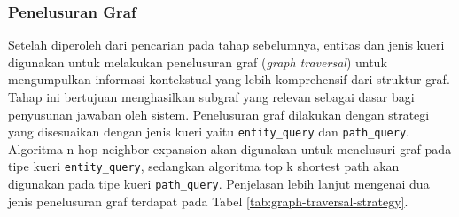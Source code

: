 \subsubsection{Penelusuran Graf}
Setelah diperoleh dari pencarian pada tahap sebelumnya, entitas dan jenis kueri digunakan untuk melakukan penelusuran graf (\textit{graph traversal}) untuk mengumpulkan informasi kontekstual yang lebih komprehensif dari struktur graf.
Tahap ini bertujuan menghasilkan subgraf yang relevan sebagai dasar bagi penyusunan jawaban oleh sistem.
Penelusuran graf dilakukan dengan strategi yang disesuaikan dengan jenis kueri yaitu \texttt{entity\_query} dan \texttt{path\_query}.
Algoritma n-hop neighbor expansion akan digunakan untuk menelusuri graf pada tipe kueri \texttt{entity\_query}, sedangkan algoritma top k shortest path akan digunakan pada tipe kueri \texttt{path\_query}.
Penjelasan lebih lanjut mengenai dua jenis penelusuran graf terdapat pada Tabel \ref{tab:graph-traversal-strategy}.


